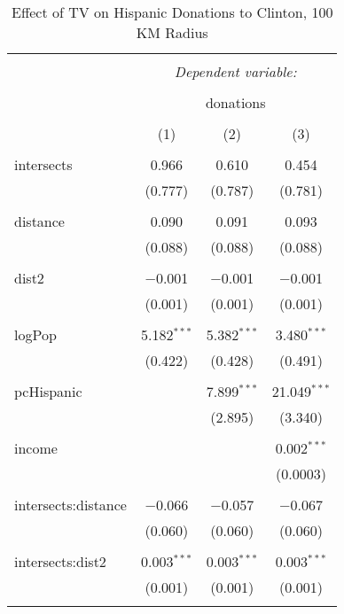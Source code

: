 
\begin{table}[!htbp] \centering 
  \caption{Effect of TV on Hispanic Donations to Clinton, 100 KM Radius} 
  \label{} 
\begin{tabular}{@{\extracolsep{-5pt}}lccc} 
\\[-1.8ex]\hline 
\hline \\[-1.8ex] 
 & \multicolumn{3}{c}{\textit{Dependent variable:}} \\ 
\cline{2-4} 
\\[-1.8ex] & \multicolumn{3}{c}{donations} \\ 
\\[-1.8ex] & (1) & (2) & (3)\\ 
\hline \\[-1.8ex] 
 intersects & 0.966 & 0.610 & 0.454 \\ 
  & (0.777) & (0.787) & (0.781) \\ 
  & & & \\ 
 distance & 0.090 & 0.091 & 0.093 \\ 
  & (0.088) & (0.088) & (0.088) \\ 
  & & & \\ 
 dist2 & $-$0.001 & $-$0.001 & $-$0.001 \\ 
  & (0.001) & (0.001) & (0.001) \\ 
  & & & \\ 
 logPop & 5.182$^{***}$ & 5.382$^{***}$ & 3.480$^{***}$ \\ 
  & (0.422) & (0.428) & (0.491) \\ 
  & & & \\ 
 pcHispanic &  & 7.899$^{***}$ & 21.049$^{***}$ \\ 
  &  & (2.895) & (3.340) \\ 
  & & & \\ 
 income &  &  & 0.002$^{***}$ \\ 
  &  &  & (0.0003) \\ 
  & & & \\ 
 intersects:distance & $-$0.066 & $-$0.057 & $-$0.067 \\ 
  & (0.060) & (0.060) & (0.060) \\ 
  & & & \\ 
 intersects:dist2 & 0.003$^{***}$ & 0.003$^{***}$ & 0.003$^{***}$ \\ 
  & (0.001) & (0.001) & (0.001) \\ 
  & & & \\ 

\end{tabular}
\end{table}
